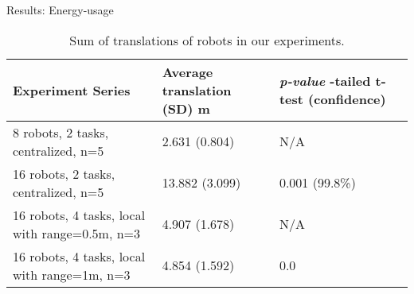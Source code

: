\documentclass{beamer}
\begin{document}
\begin{frame}[t]{Results: Energy-usage}
\begin{table}
\begin{small}
\begin{center}
\caption{Sum of translations of robots in our experiments.}
\begin{tabular}{|p{1.5in}|m{1in}|m{0.9in}|}
\hline Experiment Series & Average \protect\newline translation \protect\newline(SD) m & \textit{p-value} \protect\newline 1-tailed t-test (confidence)\\ 
\hline \alert{8 robots, 2 tasks, centralized, n=5} & 2.631 (0.804) & N/A\\ 
\hline \alert{16 robots, 2 tasks, centralized, n=5} & 13.882 (3.099) & \alert{0.001 (99.8\%)}\\
\hline \alert{16 robots, 4 tasks, local  with range=0.5m, n=3} & 4.907 (1.678) & N/A\\
\hline \alert{16 robots, 4 tasks, local  with range=1m, n=3}  & 4.854  (1.592) & 0.0\\
\hline
\end{tabular}
\label{table:motion-cmp} 
\end{center}
\end{small}
\end{table}
\end{frame}
\end{document}
